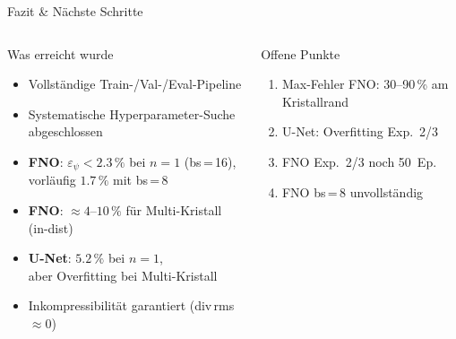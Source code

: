 \documentclass[aspectratio=169]{beamer}
\begin{document}
\begin{frame}{Fazit \& Nächste Schritte}
  \begin{columns}[T]
      \begin{block}{Was erreicht wurde}
        \begin{itemize}
          \item Vollständige Train-/Val-/Eval-Pipeline
          \item Systematische Hyperparameter-Suche abgeschlossen
          \item \textbf{FNO}: $\varepsilon_\psi < 2.3\,\%$ bei $n=1$ (bs\,=\,16),\\
                vorläufig $1.7\,\%$ mit bs\,=\,8
          \item \textbf{FNO}: $\approx 4$--$10\,\%$ für Multi-Kristall (in-dist)
          \item \textbf{U-Net}: $5.2\,\%$ bei $n=1$,\\
                aber Overfitting bei Multi-Kristall
          \item Inkompressibilität garantiert (div\,rms\,$\approx 0$)
        \end{itemize}
      \end{block}

      \begin{alertblock}{Offene Punkte}
        \begin{enumerate}
          \item Max-Fehler FNO: 30--90\,\% am Kristallrand
          \item U-Net: Overfitting Exp.~2/3
          \item FNO Exp.~2/3 noch 50~Ep.
          \item FNO bs\,=\,8 unvollständig
        \end{enumerate}
      \end{alertblock}
  \end{columns}
\end{frame}

\end{document}
